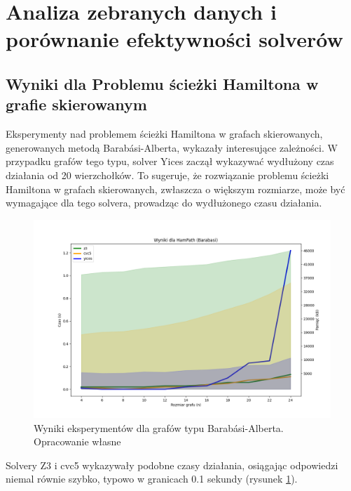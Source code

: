 


\section{Analiza zebranych danych i porównanie efektywności solverów}

\subsection{Wyniki dla Problemu ścieżki Hamiltona w grafie skierowanym}

Eksperymenty nad problemem ścieżki Hamiltona w grafach skierowanych, generowanych metodą Barabási-Alberta, wykazały interesujące zależności. W przypadku grafów tego typu, solver Yices zaczął wykazywać wydłużony czas działania od 20 wierzchołków. To sugeruje, że rozwiązanie problemu ścieżki Hamiltona w grafach skierowanych, zwłaszcza o większym rozmiarze, może być wymagające dla tego solvera, prowadząc do wydłużonego czasu działania.

\begin{figure}[htbp]
	\centering
	\begin{minipage}{\textwidth}
		\includegraphics[width=\textwidth]{./figures/1-barabasi-plot.png}
		\caption{Wyniki eksperymentów dla grafów typu Barabási-Alberta. Opracowanie własne}
		\label{fig:1-barabasi-plot}
	\end{minipage}
\end{figure}

Solvery Z3 i cvc5 wykazywały podobne czasy działania, osiągając odpowiedzi niemal równie szybko, typowo w granicach 0.1 sekundy (rysunek \ref{fig:1-barabasi-plot}). 

